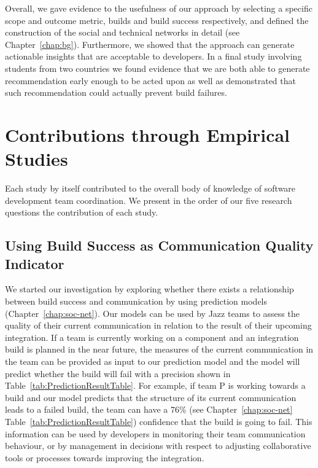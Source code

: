 Overall, we gave evidence to the usefulness of our approach by selecting a specific scope and outcome metric, builds and build success respectively, and defined the construction of the social and technical networks in detail (see Chapter~\ref{chap:bg}).
Furthermore, we showed that the approach can generate actionable insights that are acceptable to developers.
In a final study involving students from two countries we found evidence that we are both able to generate recommendation early enough to be acted upon as well as demonstrated that such recommendation could actually prevent build failures.



\section{Contributions through Empirical Studies}
\label{sec:cont:emp}
Each study by itself contributed to the overall body of knowledge of software development team coordination.
We present in the order of our five research questions the contribution of each  study.


\subsection{Using Build Success as Communication Quality Indicator}
\label{subsec:practicalimpl}
%
We started our investigation by exploring whether there exists a relationship between build success and communication by using prediction models (Chapter~\ref{chap:soc-net}).
Our models can be used by Jazz teams to assess the quality of their current
communication in relation to the result of their upcoming integration. If a team
is currently working on a component and an integration build is planned in the
near future, the measures of the current communication in the team can be
provided as input to our prediction model and the model will predict whether the
build will fail with a precision shown in Table~\ref{tab:PredictionResultTable}.
For example, if team P is working towards a build and our model predicts that the
structure of its current communication leads to a failed build, the team can have
a 76\% (see Chapter~\ref{chap:soc-net} Table~\ref{tab:PredictionResultTable}) confidence that the build is
going to fail. This information can be used by developers in monitoring their
team communication behaviour, or by management in decisions with respect to
adjusting collaborative tools or processes towards improving the integration.

